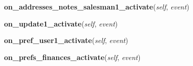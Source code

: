     \vspace{0.5ex}

\hspace{.8\funcindent}\begin{boxedminipage}{\funcwidth}

    \raggedright \textbf{on\_addresses\_notes\_salesman1\_activate}(\textit{self}, \textit{event})

\setlength{\parskip}{2ex}
\setlength{\parskip}{1ex}
    \end{boxedminipage}

    \label{Cuon:MainWindow:on_update1_activate}

    \vspace{0.5ex}

\hspace{.8\funcindent}\begin{boxedminipage}{\funcwidth}

    \raggedright \textbf{on\_update1\_activate}(\textit{self}, \textit{event})

\setlength{\parskip}{2ex}
\setlength{\parskip}{1ex}
    \end{boxedminipage}

    \label{Cuon:MainWindow:on_pref_user1_activate}

    \vspace{0.5ex}

\hspace{.8\funcindent}\begin{boxedminipage}{\funcwidth}

    \raggedright \textbf{on\_pref\_user1\_activate}(\textit{self}, \textit{event})

\setlength{\parskip}{2ex}
\setlength{\parskip}{1ex}
    \end{boxedminipage}

    \label{Cuon:MainWindow:on_prefs_finances_activate}

    \vspace{0.5ex}

\hspace{.8\funcindent}\begin{boxedminipage}{\funcwidth}

    \raggedright \textbf{on\_prefs\_finances\_activate}(\textit{self}, \textit{event})

\setlength{\parskip}{2ex}
\setlength{\parskip}{1ex}
    \end{boxedminipage}

